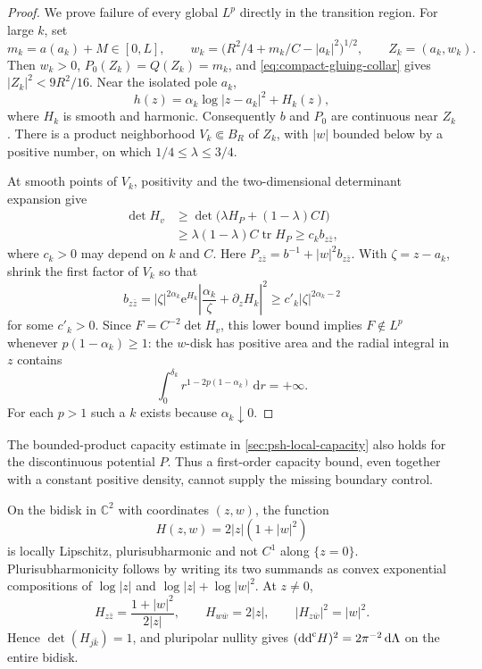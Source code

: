 \begin{proof}
We prove failure of every global $L^p$ directly in the transition region. For large $k$, set
\[
 m_k=a(a_k)+M\in[0,L],\qquad
 w_k=\bigl(R^2/4+m_k/C-|a_k|^2\bigr)^{1/2},
 \qquad Z_k=(a_k,w_k).
\]
Then $w_k>0$, $P_0(Z_k)=Q(Z_k)=m_k$, and \eqref{eq:compact-gluing-collar} gives $|Z_k|^2<9R^2/16$. Near the isolated pole $a_k$,
\[
 h(z)=\alpha_k\log|z-a_k|^2+H_k(z),
\]
where $H_k$ is smooth and harmonic. Consequently $b$ and $P_0$ are continuous near $Z_k$. There is a product neighborhood $V_k\Subset B_R$ of $Z_k$, with $|w|$ bounded below by a positive number, on which $1/4\leq\lambda\leq3/4$.

At smooth points of $V_k$, positivity and the two-dimensional determinant expansion give
\[
 \begin{split}
 \det H_v&\geq\det\bigl(\lambda H_P+(1-\lambda)CI\bigr)\\
 &\geq\lambda(1-\lambda)C\operatorname{tr}H_P
 \geq c_k b_{z\bar z},
 \end{split}
\]
where $c_k>0$ may depend on $k$ and $C$. Here $P_{z\bar z}=b^{-1}+|w|^2b_{z\bar z}$. With $\zeta=z-a_k$, shrink the first factor of $V_k$ so that
\[
 b_{z\bar z}=|\zeta|^{2\alpha_k}\mathrm{e}^{H_k}
       \left|\frac{\alpha_k}{\zeta}+\partial_zH_k\right|^2
       \geq c'_k|\zeta|^{2\alpha_k-2}
\]
for some $c'_k>0$. Since $F=C^{-2}\det H_v$, this lower bound implies $F\notin L^p$ whenever $p(1-\alpha_k)\geq1$: the $w$-disk has positive area and the radial integral in $z$ contains
\[
 \int_0^{\delta_k}r^{1-2p(1-\alpha_k)}\,\mathrm{d}r=+\infty.
\]
For each $p>1$ such a $k$ exists because $\alpha_k\downarrow0$.
\end{proof}

The bounded-product capacity estimate in \cref{sec:psh-local-capacity} also holds for the discontinuous potential $P$. Thus a first-order capacity bound, even together with a constant positive density, cannot supply the missing boundary control.

\begin{example}\label{ex:local-lipschitz-constant-measure}
On the bidisk in $\mathbb C^2$ with coordinates $(z,w)$, the function
\[
 H(z,w)=2|z|(1+|w|^2)
\]
is locally Lipschitz, plurisubharmonic and not $C^1$ along $\{z=0\}$. Plurisubharmonicity follows by writing its two summands as convex exponential compositions of $\log|z|$ and $\log|z|+\log|w|^2$. At $z\ne0$,
\[
 H_{z\bar z}=\frac{1+|w|^2}{2|z|},\qquad
 H_{w\bar w}=2|z|,\qquad
 |H_{z\bar w}|^2=|w|^2.
\]
Hence $\det(H_{j\bar k})=1$, and pluripolar nullity gives $(\mathrm{dd}^{\mathrm{c}} H)^2=2\pi^{-2}\,\mathrm{d}\Lambda$ on the entire bidisk.
\end{example}

